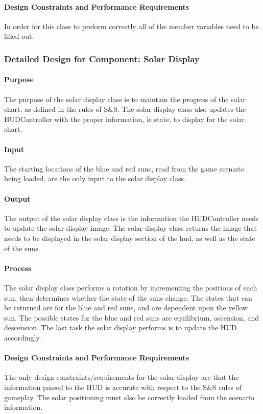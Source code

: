 \documentclass[12pt,a4paper,titlepage]{article}
\begin{document}
\paragraph{Design Constraints and Performance Requirements} In order for this class to preform correctly all of the member variables need to be filled out.

\subsubsection{Detailed Design for Component: Solar Display}
\paragraph{Purpose} The purpose of the solar display class is to maintain the progress of the solar chart, as defined in the rules of S\&S. The solar display class also updates the HUDController with the proper information, ie state, to display for the solar chart.
\paragraph{Input} The starting locations of the blue and red suns, read from the game scenario being loaded, are the only input to the solar display class.
\paragraph{Output} The output of the solar display class is the information the HUDController needs to update the solar display image. The solar display class returns the image that needs to be displayed in the solar display section of the hud, as well as the state of the suns.
\paragraph{Process} The solar display class performs a rotation by incrementing the positions of each sun, then determines whether the state of the suns change. The states that can be returned are for the blue and red suns, and are dependent upon the yellow sun. The possible states for the blue and red suns are equilibrium, ascension, and descension. The last task the solar display performs is to update the HUD accordingly. 
\paragraph{Design Constraints and Performance Requirements} The only design constraints/requirements for the solar display are that the information passed to the HUD is accurate with respect to the S\&S rules of gameplay. The solar positioning must also be correctly loaded from the scenario information. 
\end{document}
